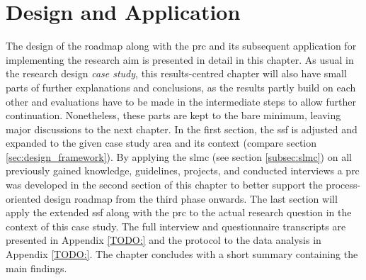 
\chapter{Design and Application} %

\label{chapter4}

The design of the roadmap along with the \acrfull{prc} and its subsequent application for implementing the research aim is presented in detail in this chapter. As usual in the research design \textit{case study}, this results-centred chapter will also have small parts of further explanations and conclusions, as the results partly build on each other and evaluations have to be made in the intermediate steps to allow further continuation. Nonetheless, these parts are kept to the bare minimum, leaving major discussions to the next chapter.\newline %
In the first section, the \acrshort{ssf} is adjusted and expanded to the given case study area and its context (compare section \ref*{sec:design_framework}). By applying the \acrshort{slmc} (see section \ref*{subsec:slmc}) on all previously gained knowledge, guidelines, projects, and conducted interviews a \acrshort{prc} was developed in the second section of this chapter to better support the process-oriented design roadmap from the third phase onwards. The last section will apply the extended \acrshort{ssf} along with the \acrshort{prc} to the actual research question in the context of this case study.\newline
The full interview and questionnaire transcripts are presented in Appendix \ref*{TODO:} and the protocol to the data analysis in Appendix \ref*{TODO:}. The chapter concludes with a short summary containing the main findings.


